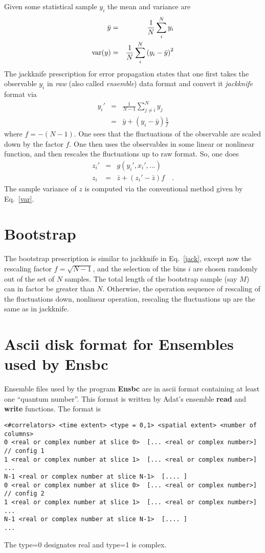 \documentclass[11pt]{article}
\begin{document}
Given some statistical sample $y_i$ the mean and variance are
\begin{eqnarray}
\bar{y} &=& \frac{1}{N}\sum_i^N y_i\\
{\rm var}(y) &=& \frac{1}{N}\sum_i^N \left(y_i - \bar{y}\right)^2\label{var}
\end{eqnarray}
The jackknife prescription for error propagation states that one first
takes the observable $y_i$ in {\em raw} (also called {\em ensemble})
data format and convert it {\em jackknife} format via
\begin{eqnarray}
y_i' &=& \frac{1}{N-1}\sum_{j\ne i}^N y_j \\
     &=& \bar{y} + \left(y_i - \bar{y}\right) \frac{1}{f} \label{jack}
\end{eqnarray}
where $f=-(N-1)$. One sees that the fluctuations of the observable
are scaled down by the factor $f$. One then uses the observables in some
linear or nonlinear function, and then rescales the fluctuations up to raw
format. So, one does
\begin{eqnarray}
z_i' &=& g(y_i',x_i',...)\label{nonlinear}\\
z_i  &=& \bar{z} + \left(z_i' - \bar{z}\right) f \quad.
\end{eqnarray}
The sample variance of $z$ is computed via the conventional method given 
by Eq.~\ref{var}.

\section{Bootstrap}\label{sec:bootstrap}

The bootstrap prescription is similar to jackknife in Eq.~\ref{jack},
except now the rescaling factor $f=\sqrt{N-1}$, and the selection of
the bins $i$ are chosen randomly out of the set of $N$ samples. The
total length of the bootstrap sample (say $M$) can in factor be
greater than $N$.  Otherwise, the operation sequence of rescaling of
the fluctuations down, nonlinear operation, rescaling the fluctuations
up are the same as in jackknife.

\section{Ascii disk format for Ensembles used by Ensbc}
\label{sec:ascii_format}

Ensemble files used by the program {\bf Ensbc} are in ascii format
containing at least one ``quantum number''. This format is written by
Adat's ensemble {\bf read} and {\bf write} functions.
The format is
\begin{verbatim}
<#correlators> <time extent> <type = 0,1> <spatial extent> <number of columns>
0 <real or complex number at slice 0>  [... <real or complex number>]   // config 1
1 <real or complex number at slice 1>  [... <real or complex number>]
...
N-1 <real or complex number at slice N-1>  [.... ]
0 <real or complex number at slice 0>  [... <real or complex number>]   // config 2
1 <real or complex number at slice 1>  [... <real or complex number>]
...
N-1 <real or complex number at slice N-1>  [.... ]
...
\end{verbatim}
The {\rm type=0} designates {\rm real} and {\rm type=1} is {\rm complex}.
\end{document}
